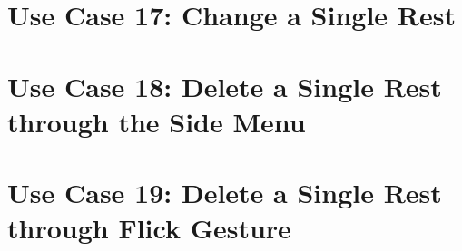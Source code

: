 
  \section{Use Case 17: Change a Single Rest}


  \section{Use Case 18: Delete a Single Rest through the Side Menu}



  \section{Use Case 19: Delete a Single Rest through Flick Gesture}

